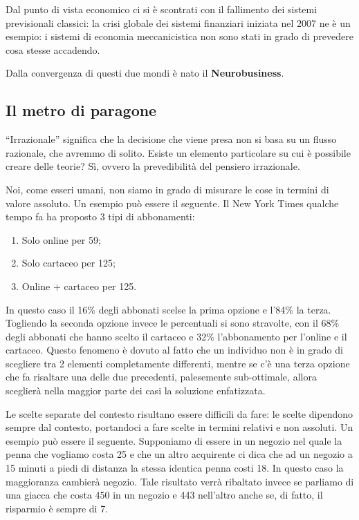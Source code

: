 Dal punto di vista economico ci si è scontrati con il fallimento dei sistemi
previsionali classici: la crisi globale dei sistemi finanziari iniziata nel
2007 ne è un esempio: i sistemi di economia meccanicistica non sono stati in
grado di prevedere cosa stesse accadendo.

Dalla convergenza di questi due mondi è nato il \textbf{Neurobusiness}.

\subsection{Il metro di paragone}

``Irrazionale'' significa che la decisione che viene presa non si basa su un
flusso razionale, che avremmo di solito. Esiste un elemento particolare su cui
è possibile creare delle teorie? Sì, ovvero la prevedibilità del pensiero
irrazionale.

Noi, come esseri umani, non siamo in grado di misurare le cose in termini di
valore assoluto.
Un esempio può essere il seguente. Il New York Times qualche tempo fa ha proposto 3 tipi di abbonamenti:
\begin{enumerate}
 \item Solo online per 59\textdollar{};
 \item Solo cartaceo per 125\textdollar{};
 \item Online + cartaceo per 125\textdollar{}.
\end{enumerate}
In questo caso il 16\% degli abbonati scelse la prima opzione e l'84\% la terza.
Togliendo la seconda opzione invece le percentuali si sono stravolte, con il
68\% degli abbonati che hanno scelto il cartaceo e 32\% l'abbonamento per
l'online e il cartaceo. 
Questo fenomeno è dovuto al fatto che un individuo non è in grado di scegliere
tra 2 elementi completamente differenti, mentre se c'è una terza opzione che fa
risaltare una delle due precedenti, palesemente sub-ottimale, allora sceglierà
nella maggior parte dei casi la soluzione enfatizzata.

Le scelte separate del contesto risultano essere difficili da fare: le scelte
dipendono sempre dal contesto, portandoci a fare scelte in termini relativi e
non assoluti.
Un esempio può essere il seguente. Supponiamo di essere in un negozio nel quale
la penna che vogliamo costa 25\textdollar{} e che un altro acquirente ci dica
che ad un negozio a 15 minuti a piedi di distanza la stessa identica penna
costi 18\textdollar{}. In questo caso la maggioranza cambierà negozio. Tale
risultato verrà ribaltato invece se parliamo di una giacca che costa
450\textdollar{} in un negozio e 443\textdollar{} nell'altro anche se, di
fatto, il risparmio è sempre di 7\textdollar{}.

